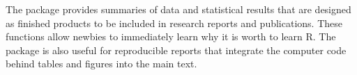 The package  provides summaries of data and statistical
results that are designed as finished products to be included in
research reports and publications. These functions allow newbies to
immediately learn why it is worth to learn R. The package is also
useful for reproducible reports that integrate the computer code
behind tables and figures into the main text.
